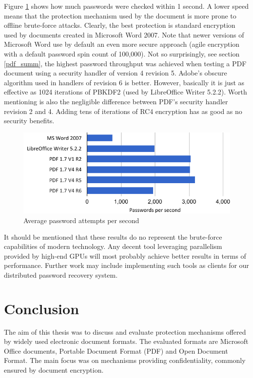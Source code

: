 \documentclass[11pt,oneside]{fithesis2}
\begin{document}
Figure \ref{average_speed} shows how much passwords were checked within 1 second. A lower speed means that the protection mechanism used by the document is more prone to offline brute-force attacks. Clearly, the best protection is standard encryption used by documents created in Microsoft Word 2007. Note that newer versions of Microsoft Word use by default an even more secure approach (agile encryption with a default password spin count of 100,000).
Not so surprisingly, see section \ref{pdf_summ}, the highest password throughput was achieved when testing a PDF document using a security handler of version 4 revision 5. Adobe's obscure algorithm used in handlers of revision 6 is better. However, basically it is just as effective as 1024 iterations of PBKDF2 (used by LibreOffice Writer 5.2.2).  Worth mentioning is also the negligible difference between PDF's security handler revision 2 and 4. Adding tens of iterations of RC4 encryption has as good as no security benefits. 

\begin{figure}[ht]
	\centering
	\includegraphics[width=1\textwidth]{figures/average_speed.pdf}
	\caption{Average password attempts per second}
	\label{average_speed}
\end{figure}

It should be mentioned that these results do no represent the brute-force capabilities of modern technology. Any decent tool leveraging parallelism provided by high-end GPUs will most probably achieve better results in terms of performance. Further work may include implementing such tools as clients for our distributed password recovery system. 

\chapter{Conclusion}

The aim of this thesis was to discuss and evaluate protection mechanisms offered by widely used electronic document formats. The evaluated formats are Microsoft Office documents, Portable Document Format (PDF) and Open Document Format.  The main focus was on mechanisms providing confidentiality, commonly ensured by document encryption. 
\end{document}
